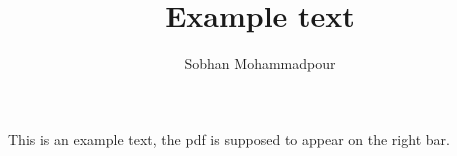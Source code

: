 \documentclass{article}
\title{Example text}
\author{Sobhan Mohammadpour}
\begin{document}
	\maketitle
	This is an example text, the pdf is supposed to appear on the right bar.
\end{document}

